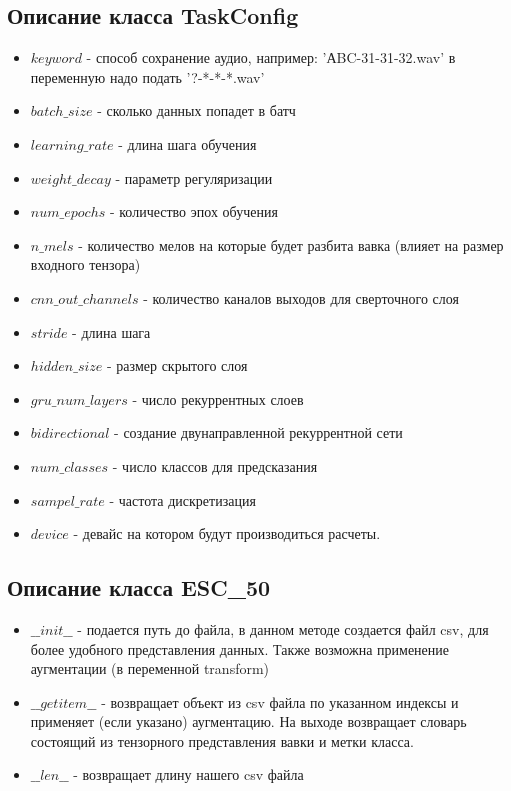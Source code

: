 \documentclass[a4paper,12pt]{article}
\begin{document}
 	\subsection{Описание класса TaskConfig}\label{TaskConfig}
 		\begin{itemize}
 		\item $keyword$ - способ сохранение аудио, например: 'АBC-31-31-32.wav' в переменную надо подать '?-*-*-*.wav'
 		\item $batch\_size$ - сколько данных попадет в батч
 		\item $learning\_rate$ - длина шага обучения
 		\item $weight\_decay$ - параметр регуляризации
 		\item $num\_epochs$ - количество эпох обучения
 		\item $n\_mels$ - количество мелов на которые будет разбита вавка (влияет на размер входного тензора)
 		\item $cnn\_out\_channels$ - количество каналов выходов для сверточного слоя
 		\item $stride$ - длина шага
 		\item $hidden\_size$ - размер скрытого слоя
 		\item $gru\_num\_layers$ - число рекуррентных слоев
 		\item $bidirectional$ - создание двунаправленной рекуррентной сети
 		\item $num\_classes$ - число классов для предсказания
 		\item $sampel\_rate$ - частота дискретизация
 		\item $device$ - девайс на котором будут производиться расчеты.
 	\end{itemize}
 	
 	\subsection{Описание класса ESC\_50}\label{ESC50}
 		\begin{itemize}
 		\item $\_\_init\_\_$ - подается путь до файла, в данном методе создается файл csv, для более удобного представления данных. Также возможна применение аугментации (в переменной transform)
 		\item $\_\_getitem\_\_$ - возвращает объект из csv файла по указанном индексы и применяет (если указано) аугментацию. На выходе возвращает словарь состоящий из тензорного представления вавки и метки класса.
 		\item $\_\_len\_\_$ - возвращает длину нашего csv файла
 	\end{itemize}
\end{document}
